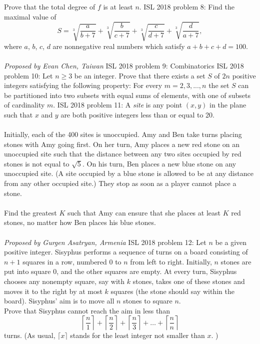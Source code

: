 Prove that the total degree of $f$ is at least $n$. 
ISL 2018 problem 8:  Find the maximal value of
\[
S = \sqrt[3]{\frac{a}{b+7}} + \sqrt[3]{\frac{b}{c+7}} + \sqrt[3]{\frac{c}{d+7}} + \sqrt[3]{\frac{d}{a+7}},
\]
where $a$, $b$, $c$, $d$ are nonnegative real numbers which satisfy $a+b+c+d = 100$. \\\\
\textit{Proposed by Evan Chen, Taiwan} 
ISL 2018 problem 9:  Combinatorics 
ISL 2018 problem 10:  Let $n\geqslant 3$ be an integer. Prove that there exists a set $S$ of $2n$ positive integers satisfying the following property: For every $m=2,3,...,n$ the set $S$ can be partitioned into two subsets with equal sums of elements, with one of subsets of cardinality $m$. 
ISL 2018 problem 11:  A \textit{site} is any point $(x, y)$ in the plane such that $x$ and $y$ are both positive integers less than or equal to 20. \\\\
Initially, each of the 400 sites is unoccupied. Amy and Ben take turns placing stones with Amy going first. On her turn, Amy places a new red stone on an unoccupied site such that the distance between any two sites occupied by red stones is not equal to $\sqrt{5}$. On his turn, Ben places a new blue stone on any unoccupied site. (A site occupied by a blue stone is allowed to be at any distance from any other occupied site.) They stop as soon as a player cannot place a stone. \\\\
Find the greatest $K$ such that Amy can ensure that she places at least $K$ red stones, no matter how Ben places his blue stones. \\\\
\textit{Proposed by Gurgen Asatryan, Armenia} 
ISL 2018 problem 12:  Let $n$ be a given positive integer. Sisyphus performs a sequence of turns on a board consisting of $n + 1$ squares in a row, numbered $0$ to $n$ from left to right. Initially, $n$ stones are put into square $0$, and the other squares are empty. At every turn, Sisyphus chooses any nonempty square, say with $k$ stones, takes one of these stones and moves it to the right by at most $k$ squares (the stone should say within the board). Sisyphus' aim is to move all $n$ stones to square $n$. \\
Prove that Sisyphus cannot reach the aim in less than
\[
\left \lceil \frac{n}{1} \right \rceil + \left \lceil \frac{n}{2} \right \rceil + \left \lceil \frac{n}{3} \right \rceil + \dots + \left \lceil \frac{n}{n} \right \rceil
\]
turns. (As usual, $\lceil x \rceil$ stands for the least integer not smaller than $x$. ) 
